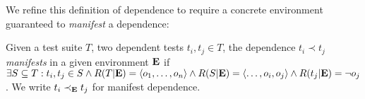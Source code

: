 %
%
%
%
%
%
%


We refine this definition of dependence to require a concrete environment guaranteed
to \emph{manifest} a dependence:
\begin{definition} \label{def:manifest}
Given a test suite\/ $T$, two dependent tests\/ $t_i, t_j \in T$,
the dependence\/ $t_i \prec t_j$ \emph{manifests} in a given
environment\/
$\mathbf{E}$ if\/ $\exists {S \subseteq T}: t_i, t_j \in S \wedge
R(T|\mathbf{E})
=  \langle o_1, \dots, o_n \rangle  \wedge R(S|\mathbf{E}) =
 \langle \dots,o_i,o_j \rangle  \wedge R(t_j|\mathbf{E}) = \neg o_j$. We
write\/ $t_i \prec_{\mathbf{E}} t_j$ for manifest dependence.
\end{definition}

